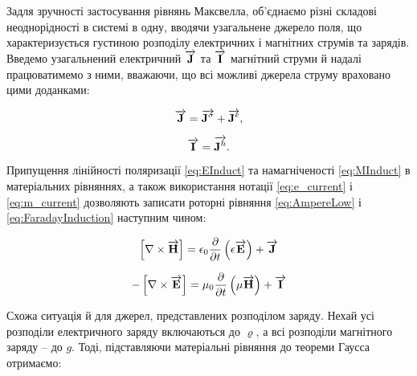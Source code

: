 Задля зручності застосування рівнянь Максвелла, об'єднаємо різні складові 
неоднорідності в системі в одну, вводячи узагальнене джерело поля, що 
характеризується густиною розподілу електричних і магнітних струмів та 
зарядів. Введемо узагальнений електричний $ \overrightarrow{\mathbf J} $ та $ \overrightarrow{\mathbf I} $ магнітний 
струми й надалі працюватимемо з ними, вважаючи, що всі можливі джерела струму 
враховано цими доданками:

\begin{equation} \label{eq:e_current}
\overrightarrow{\mathbf J} = \overrightarrow{\mathbf J^\sigma} + \overrightarrow{\mathbf J^e},
\end{equation}

\begin{equation} \label{eq:m_current}
\overrightarrow{\mathbf I} = \overrightarrow{\mathbf J^h}.
\end{equation}

Припущення лінійності поляризації \eqref{eq:EInduct} та намагніченості 
\eqref{eq:MInduct} в матеріальних рівняннях, а також використання нотації
\eqref{eq:e_current} і \eqref{eq:m_current} дозволяють записати роторні 
рівняння \eqref{eq:AmpereLow} і \eqref{eq:FaradayInduction} наступним чином:

%
\begin{equation} \label{eq:rotHfromE}
\left[ \nabla \times \overrightarrow{\mathbf H} \right] = 
\epsilon_0 \frac{\partial }{\partial t} \left( \epsilon \overrightarrow{\mathbf E} \right) + \overrightarrow{\mathbf J}
\end{equation}

\begin{equation} \label{eq:rotEfromH} 
- \left[ \nabla \times \overrightarrow{\mathbf E} \right] = 
\mu_0 \frac{\partial }{\partial t} \left( \mu \overrightarrow{\mathbf H} \right) + \overrightarrow{\mathbf I}
\end{equation}

Схожа ситуація й для джерел, представлених розподілом заряду. Нехай
усі розподіли електричного заряду включаються до $ \varrho $, а всі розподіли 
магнітного заряду -- до $ g $. Тоді, підставляючи матеріальні рівняння до 
теореми Гаусса отримаємо:


